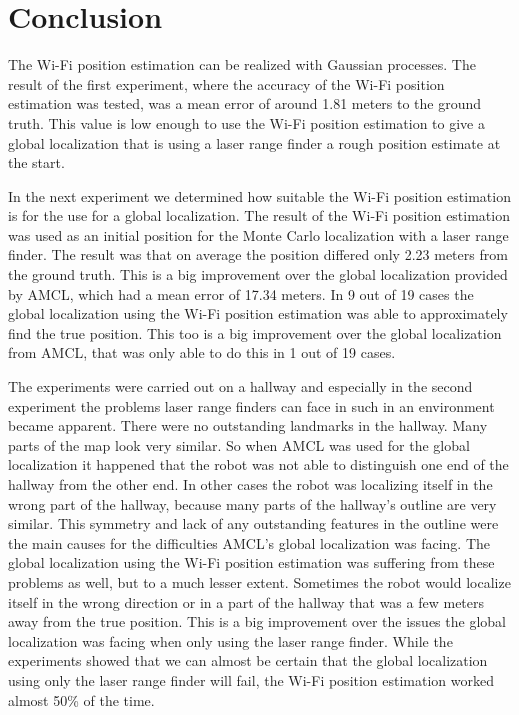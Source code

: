 \chapter{Conclusion} %
\label{Chapter5}
The Wi-Fi position estimation can be realized with Gaussian processes. The result of the first experiment, where the accuracy of the Wi-Fi position estimation was tested, was a mean error of around 1.81 meters to the ground truth. This value is low enough to use the Wi-Fi position estimation to give a global localization that is using a laser range finder a rough position estimate at the start. 

In the next experiment we determined how suitable the Wi-Fi position estimation is for the use for a global localization. The result of the Wi-Fi position estimation was used as an initial position for the Monte Carlo localization with a laser range finder. The result was that on average the position differed only 2.23 meters from the ground truth. This is a big improvement over the global localization provided by AMCL, which had a mean error of 17.34 meters. In 9 out of 19 cases the global localization using the Wi-Fi position estimation was able to approximately find the true position. This too is a big improvement over the global localization from AMCL, that was only able to do this in 1 out of 19 cases. 

The experiments were carried out on a hallway and especially in the second experiment the problems laser range finders can face in such in an environment became apparent. There were no outstanding landmarks in the hallway. Many parts of the map look very similar. So when AMCL was used for the global localization it happened that the robot was not able to distinguish one end of the hallway from the other end. In other cases the robot was localizing itself in the wrong part of the hallway, because many parts of the hallway's outline are very similar. This symmetry and lack of any outstanding features in the outline were the main causes for the difficulties AMCL's global localization was facing. The global localization using the Wi-Fi position estimation was suffering from these problems as well, but to a much lesser extent. Sometimes the robot would localize itself in the wrong direction or in a part of the hallway that was a few meters away from the true position. This is a big improvement over the issues the global localization was facing when only using the laser range finder. While the experiments showed that we can almost be certain that the global localization using only the laser range finder will fail, the Wi-Fi position estimation worked almost 50\% of the time. 

